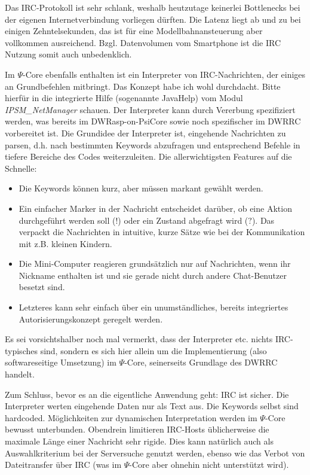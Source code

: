 Das IRC-Protokoll ist sehr schlank, weshalb heutzutage keinerlei Bottlenecks bei der eigenen Internetverbindung vorliegen d\"urften.
Die Latenz liegt ab und zu bei einigen Zehntelsekunden, das ist f\"ur eine Modellbahnansteuerung aber vollkommen ausreichend.
Bzgl. Datenvolumen vom Smartphone ist die IRC Nutzung somit auch unbedenklich.

Im $\Psi$-Core ebenfalls enthalten ist ein Interpreter von IRC-Nachrichten, der einiges an Grundbefehlen mitbringt.
Das Konzept habe ich wohl durchdacht.
Bitte hierf\"ur in die integrierte Hilfe (sogenannte JavaHelp) vom Modul \textit{IPSM\_NetManager} schauen.
Der Interpreter kann durch Vererbung spezifiziert werden, was bereits im DWRasp-on-PsiCore sowie noch spezifischer im DWRRC vorbereitet ist.
Die Grundidee der Interpreter ist, eingehende Nachrichten zu parsen, d.h. nach bestimmten Keywords abzufragen und entsprechend Befehle in tiefere Bereiche des Codes weiterzuleiten.
Die allerwichtigsten Features auf die Schnelle:
\begin{itemize}
	\item Die Keywords k\"onnen kurz, aber m\"ussen markant gew\"ahlt werden.
	\item Ein einfacher Marker in der Nachricht entscheidet dar\"uber, ob eine Aktion durchgef\"uhrt werden soll ($!$) oder ein Zustand abgefragt wird ($?$).
	Das verpackt die Nachrichten in intuitive, kurze S\"atze wie bei der Kommunikation mit z.B. kleinen Kindern.
	\item Die Mini-Computer reagieren grunds\"atzlich nur auf Nachrichten, wenn ihr Nickname enthalten ist und sie gerade nicht durch andere Chat-Benutzer besetzt sind.
	\item Letzteres kann sehr einfach \"uber ein unumst\"andliches, bereits integriertes Autorisierungskonzept geregelt werden.
\end{itemize}
Es sei vorsichtshalber noch mal vermerkt, dass der Interpreter etc. nichts IRC-typisches sind, sondern es sich hier allein um die Implementierung (also softwareseitige Umsetzung) im $\Psi$-Core, seinerseits Grundlage des DWRRC handelt.

Zum Schluss, bevor es an die eigentliche Anwendung geht:
IRC ist sicher.
Die Interpreter werten eingehende Daten nur als Text aus.
Die Keywords selbst sind hardcoded.
M\"oglichkeiten zur dynamischen Interpretation werden im $\Psi$-Core bewusst unterbunden.
Obendrein limitieren IRC-Hosts \"ublicherweise die maximale L\"ange einer Nachricht sehr rigide.
Dies kann nat\"urlich auch als Auswahlkriterium bei der Serversuche genutzt werden, ebenso wie das Verbot von Dateitransfer \"uber IRC (was im $\Psi$-Core aber ohnehin nicht unterst\"utzt wird).

